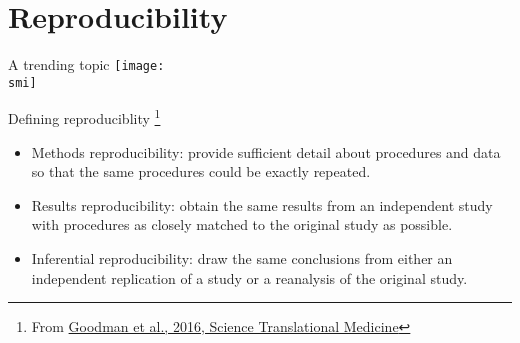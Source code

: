 \documentclass[10pt, usenames, dvipsnames]{beamer}
\def\smi{out/ln/updir/mw-gcthesis-oral/library.bib}
\newcommand\blfootnote[1]{%
  \begingroup
  \renewcommand\thefootnote{}\footnote{#1}%
  \addtocounter{footnote}{-1}%
  \endgroup
  }
\begin{document}
\section{Reproducibility}
\begin{frame}{A trending topic}
  \def\smi{out/ln/updir/mw-gcthesis-oral/ink/reproducibility/pubmed_trend_reproducibility_crisis.pdf}
  \texttt{[image: \\smi]}%
\end{frame}
\begin{frame}{Defining reproduciblity}
  \blfootnote{From \href{https://doi.org/10.1108/CG-10-2012-0073}{Goodman et al., 2016, Science Translational Medicine}}
  \begin{itemize}
    \item Methods reproducibility: provide sufficient detail about procedures and data so that the same procedures could be exactly repeated.
    \item Results reproducibility: obtain the same results from an independent study with procedures as closely matched to the original study as possible.
    \item Inferential reproducibility: draw the same conclusions from either an independent replication of a study or a reanalysis of the original study.
  \end{itemize}
\end{frame}
\end{document}
